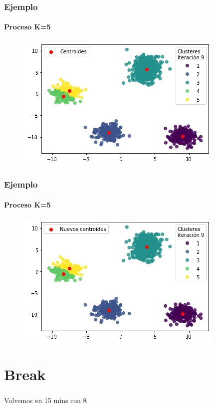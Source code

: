 \documentclass[
  shownotes,
  xcolor={svgnames},
  hyperref={colorlinks,citecolor=DarkBlue,linkcolor=DarkRed,urlcolor=DarkBlue}
  , aspectratio=169]{beamer}
\begin{document}
\begin{frame}
\frametitle{Ejemplo}
\framesubtitle{Proceso K=5}


\begin{figure}[H] \centering

    \centering
    \includegraphics[scale=.7]{figures/k5_15.jpg}
  \\
  \tiny
\end{figure}


\end{frame}
\begin{frame}
\frametitle{Ejemplo}
\framesubtitle{Proceso K=5}


\begin{figure}[H] \centering

    \centering
    \includegraphics[scale=.7]{figures/k5_16.jpg}
  \\
  \tiny
\end{figure}


\end{frame}
\section{Break}
\begin{frame}
\frametitle{}

\begin{centering}
\huge
\textcolor{andesred}{Volvemos en 15 mins con \texttt{R} }

\end{centering}

\end{frame}
\end{document}

